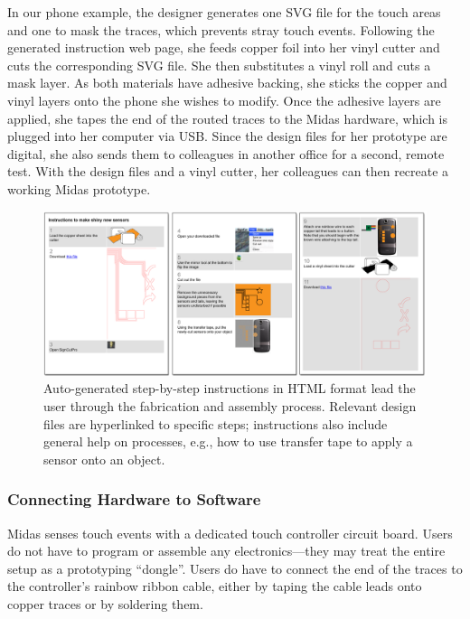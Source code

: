 In our phone example, the designer generates one SVG file
for the touch areas and one to mask the traces, which prevents
stray touch events. Following the generated instruction
web page, she feeds copper foil into her vinyl cutter and cuts
the corresponding SVG file. She then substitutes a vinyl roll
and cuts a mask layer. As both materials have adhesive backing,
she sticks the copper and vinyl layers onto the phone
she wishes to modify. Once the adhesive layers are applied,
she tapes the end of the routed traces to the Midas hardware,
which is plugged into her computer via USB. Since the design
files for her prototype are digital, she also sends them to
colleagues in another office for a second, remote test. With
the design files and a vinyl cutter, her colleagues can then
recreate a working Midas prototype.

\begin{figure}[t!]
\includegraphics[width=\textwidth]{figures/midas/instructions.png}
\caption{Auto-generated step-by-step instructions in HTML format lead the user through the fabrication and assembly process. Relevant design files are hyperlinked to specific steps; instructions also include general help on processes, e.g., how to use transfer tape to apply a sensor onto an object.} 
\label{fig:midas-instructions}
\end{figure}

        \subsubsection{Connecting Hardware to Software}
Midas senses touch events with a dedicated touch controller
circuit board. Users do not have to program or assemble any
electronics---they may treat the entire setup as a prototyping
“dongle”. Users do have to connect the end of the traces to
the controller's rainbow ribbon cable, either by taping the
cable leads onto copper traces or by soldering them.

